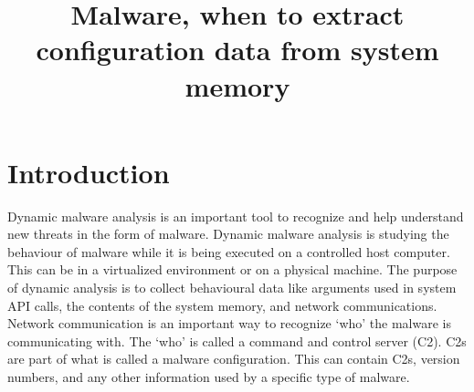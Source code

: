 \documentclass[conference]{IEEEtran}
\begin{document}
\title{Malware, when to extract configuration data from system memory}


\author{
\and
{}
}



\maketitle
\thispagestyle{plain}
\pagestyle{plain}





%
\IEEEpeerreviewmaketitle


\section{Introduction}
Dynamic malware analysis is an important tool to recognize and help understand new threats in the form of malware. 
Dynamic malware analysis is studying the behaviour of malware while it is being executed on a controlled host computer. This can be in a virtualized environment or on a physical machine. The purpose of dynamic analysis is to collect behavioural data like arguments used in system API calls, the contents of the system memory, and network communications. Network communication is an important way to recognize ‘who’ the malware is communicating with. The ‘who’ is called a command and control server (C2). C2s are part of what is called a malware configuration. This can contain C2s, version numbers, and any other information used by a specific type of malware.\\
\end{document}
